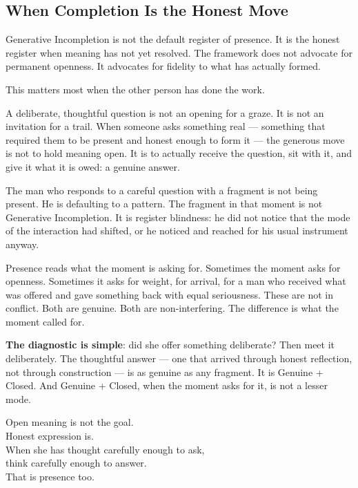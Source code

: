 \subsection{When Completion Is the Honest Move}

Generative Incompletion is not the default register of presence. It is the honest register when meaning has not yet resolved. The framework does not advocate for permanent openness. It advocates for fidelity to what has actually formed.

This matters most when the other person has done the work.

A deliberate, thoughtful question is not an opening for a graze. It is not an invitation for a trail. When someone asks something real --- something that required them to be present and honest enough to form it --- the generous move is not to hold meaning open. It is to actually receive the question, sit with it, and give it what it is owed: a genuine answer.

The man who responds to a careful question with a fragment is not being present. He is defaulting to a pattern. The fragment in that moment is not Generative Incompletion. It is register blindness: he did not notice that the mode of the interaction had shifted, or he noticed and reached for his usual instrument anyway.

Presence reads what the moment is asking for. Sometimes the moment asks for openness. Sometimes it asks for weight, for arrival, for a man who received what was offered and gave something back with equal seriousness. These are not in conflict. Both are genuine. Both are non-interfering. The difference is what the moment called for.

\textbf{The diagnostic is simple}: did she offer something deliberate? Then meet it deliberately. The thoughtful answer --- one that arrived through honest reflection, not through construction --- is as genuine as any fragment. It is Genuine + Closed. And Genuine + Closed, when the moment asks for it, is not a lesser mode.

\begin{calloutbox}
Open meaning is not the goal.\\
Honest expression is.\\[0.4em]
When she has thought carefully enough to ask,\\
think carefully enough to answer.\\
That is presence too.
\end{calloutbox}

